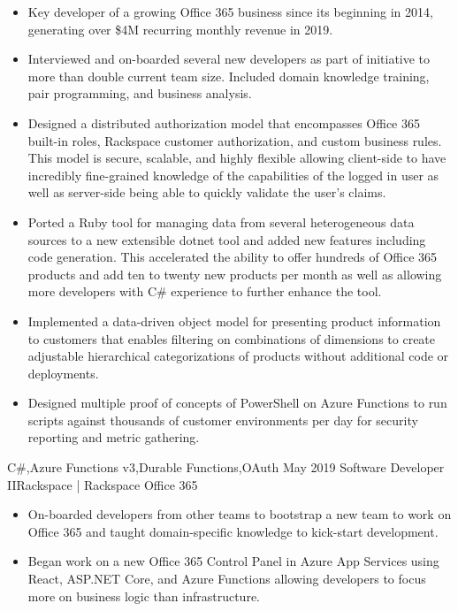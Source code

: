 \begin{experiences}
{\begin{itemize}
                        \item Key developer of a growing Office 365 business since its beginning in 2014, generating over \$4M recurring monthly revenue in 2019.
                        \item Interviewed and on-boarded several new developers as part of initiative to more than double current team size. Included domain knowledge training, pair programming, and business analysis.
                        \item Designed a distributed authorization model that encompasses Office 365 built-in roles, Rackspace customer authorization, and custom business rules. This model is secure, scalable, and highly flexible allowing client-side to have incredibly fine-grained knowledge of the capabilities of the logged in user as well as server-side being able to quickly validate the user's claims.
                        \ifcv
                        \item Ported a Ruby tool for managing data from several heterogeneous data sources to a new extensible dotnet tool and added new features including code generation. This accelerated the ability to offer hundreds of Office 365 products and add ten to twenty new products per month as well as allowing more developers with C\# experience to further enhance the tool.
                        \item Implemented a data-driven object model for presenting product information to customers that enables filtering on combinations of dimensions to create adjustable hierarchical categorizations of products without additional code or deployments.
                        \item Designed multiple proof of concepts of PowerShell on Azure Functions to run scripts against thousands of customer environments per day for security reporting and metric gathering.
                        \fi
                      \end{itemize}
                    }
                    {C\#,Azure Functions v3,Durable Functions,OAuth}
  \emptySeparator
  \experience
    {May 2019}     {Software Developer II}{Rackspace | Rackspace Office 365}
    {}
                    {
                      \begin{itemize}
                        \item On-boarded developers from other teams to bootstrap a new team to work on Office 365 and taught domain-specific knowledge to kick-start development.
                        \item Began work on a new Office 365 Control Panel in Azure App Services using React, ASP.NET Core, and Azure Functions allowing developers to focus more on business logic than infrastructure.

\end{itemize}}
\end{experiences}
